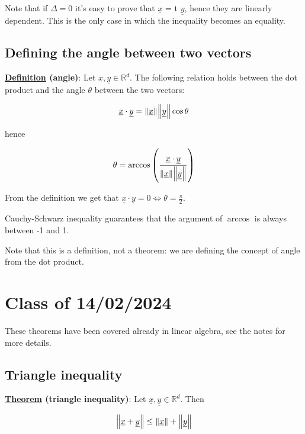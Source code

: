 \documentclass[10pt]{extarticle}
\newcommand{\R}{\mathbb{R}}
\begin{document}
Note that if $\Delta = 0$ it's easy to prove that $\underline{x}$  = t $\underline{y}$, hence they are linearly dependent. This is the only case in which the inequality becomes an equality.

\subsection{Defining the angle between two vectors}

\textbf{\underline{Definition} (angle)}: Let $\underline{x}, \underline{y} \in \R^d$. The following relation holds between the dot product and the angle $\theta$ between the two vectors:

$$
    \underline{x} \cdot \underline{y} = \norm{\underline{x}} \norm{\underline{y}} \cos \theta
$$

hence

$$
    \theta = \arccos \left( \frac{\underline{x} \cdot \underline{y}}{\norm{\underline{x}} \norm{\underline{y}}} \right)
$$

From the definition we get that $\underline{x} \cdot \underline{y} = 0 \iff \theta = \frac{\pi}{2}$.

Cauchy-Schwarz inequality guarantees that the argument of $\arccos$ is always between -1 and 1.

Note that this is a definition, not a theorem: we are defining the concept of angle from the dot product.

\section{Class of 14/02/2024}

These theorems have been covered already in linear algebra, see the notes for more details.

\subsection{Triangle inequality}

\textbf{\underline{Theorem} (triangle inequality)}: Let $\underline{x}, \underline{y} \in \R^d$. Then

$$
    \norm{\underline{x} + \underline{y}} \leq \norm{\underline{x}} + \norm{\underline{y}}
$$
\end{document}
